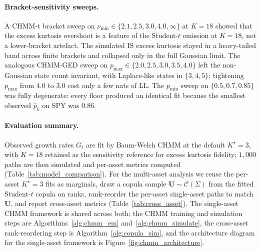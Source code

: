 \paragraph{Bracket-sensitivity sweeps.}
A CHMM-t bracket sweep on $\nu_{\min} \in \{2.1, 2.5, 3.0, 4.0, \infty\}$ at $K = 18$ showed that the excess kurtosis overshoot is a feature of the Student-$t$ emission at $K = 18$, not a lower-bracket artefact. The simulated IS excess kurtosis stayed in a heavy-tailed band across finite brackets and collapsed only in the full Gaussian limit. The analogous CHMM-GED sweep on $p_{\max} \in \{2.0, 2.5, 3.0, 3.5, 4.0\}$ left the non-Gaussian state count invariant, with Laplace-like states in $\{3,4,5\}$; tightening $p_{\max}$ from $4.0$ to $3.0$ cost only a few nats of LL. The $p_{\min}$ sweep on $\{0.5, 0.7, 0.85\}$ was fully degenerate: every floor produced an identical fit because the smallest observed $\hat p_k$ on SPY was $0.86$.


\paragraph{Evaluation summary.}
Observed growth rates $G_t$ are fit by Baum-Welch CHMM at the default $K^\star = 3$, with $K = 18$ retained as the sensitivity reference for excess kurtosis fidelity; $1{,}000$ paths are then simulated and per-asset metrics computed (Table~\ref{tab:model_comparison}). For the multi-asset analysis we reuse the per-asset $K^\star = 3$ fits as marginals, draw a copula sample $\mathbf U \sim \mathcal C(\Sigma)$ from the fitted Student-$t$ copula on ranks, rank-reorder the per-asset single-asset paths to match $\mathbf U$, and report cross-asset metrics (Table~\ref{tab:cross_asset}). The single-asset CHMM framework is shared across both; the CHMM training and simulation steps are Algorithms~\ref{alg:chmm_em} and~\ref{alg:chmm_simulate}, the cross-asset rank-reordering step is Algorithm~\ref{alg:copula_sim}, and the architecture diagram for the single-asset framework is Figure~\ref{fig:chmm_architecture}.
